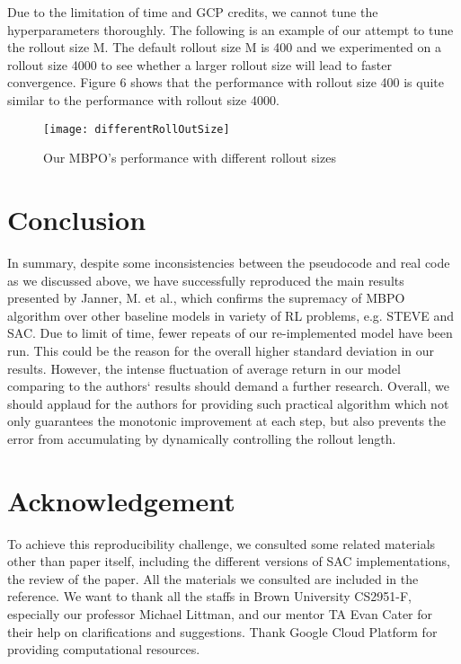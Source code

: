 \documentclass{article}
\begin{document}
Due to the limitation of time and GCP credits, we cannot tune the hyperparameters thoroughly. The following is an example of our attempt to tune the rollout size M. The default rollout size M is 400 and we experimented on a rollout size 4000 to see whether a larger rollout size will lead to faster convergence. Figure 6 shows that the performance with rollout size 400 is quite similar to the performance with rollout size 4000.

\begin{figure}[h]
  \centering
  \texttt{[image: differentRollOutSize]}
  \caption{Our MBPO's performance with different rollout sizes}
\end{figure}

\section{Conclusion}
In summary, despite some inconsistencies between the pseudocode and real code as we discussed above, we have successfully reproduced the main results presented by Janner, M. et al., which confirms the supremacy of MBPO algorithm over other baseline models in variety of RL problems, e.g. STEVE and SAC. Due to limit of time, fewer repeats of our re-implemented model have been run. This could be the reason for the overall higher standard deviation in our results. However, the intense fluctuation of average return in our model comparing to the authors` results should demand a further research. Overall, we should applaud for the authors for providing such practical algorithm which not only guarantees the monotonic improvement at each step, but also prevents the error from accumulating by dynamically controlling the rollout length.

\section*{Acknowledgement}
To achieve this reproducibility challenge, we consulted some related materials other than paper itself, including the different versions of SAC implementations, the review of the paper. All the materials we consulted are included in the reference.
We want to thank all the staffs in Brown University CS2951-F, especially our professor Michael Littman, and our mentor TA Evan Cater for their help on clarifications and suggestions. Thank Google Cloud Platform for providing computational resources.

\newpage


\end{document}
